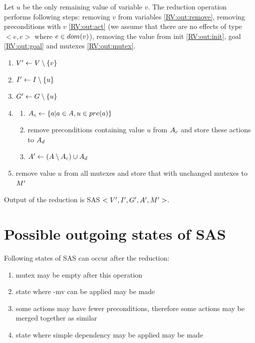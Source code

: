 	Let $u$ be the only remaining value of variable $v$. The reduction operation performs following steps: removing $v$ from variables \ref{RV:out:remove}, removing preconditions with $v$ \ref{RV:out:act} (we assume that there are no effects of type $<e,e>$ where $e \in dom(v)$), removing the value from init \ref{RV:out:init}, goal \ref{RV:out:goal} and mutexes \ref{RV:out:mutex}.
	
	\begin{enumerate}
		\item $V{}' \leftarrow V \setminus \{v\}$ \label{RV:out:remove}
		\item $I{}' \leftarrow I \setminus \{u\}$ \label{RV:out:init}
		\item $G{}' \leftarrow G \setminus \{u\}$ \label{RV:out:goal}
		\item \begin{enumerate}
			\item $A{}_c \leftarrow \{a | a \in A, u \in pre(a)\}$
			\item remove preconditions containing value $u$ from $A{}_c$ and store these actions to $A{}_d$
			\item $A{}' \leftarrow (A \setminus A{}_c) \cup A{}_d$ \label{RV:out:act}
		\end{enumerate}
		\item remove value $u$ from all mutexes and store that with unchanged mutexes to $M{}'$ \label{RV:out:mutex}
	\end{enumerate}
	
	Output of the reduction is SAS $<V{}', I{}', G{}', A{}', M{}'>$.
	
	\section{Possible outgoing states of SAS}
	Following states of SAS can occur after the reduction:
	
	\begin{enumerate}
		\item mutex may be empty after this operation 
		\item state where -mv can be applied may be made
		\item some actions may have fewer preconditions, therefore some actions may be merged together as similar
		\item state where simple dependency may be applied may be made
	\end{enumerate}
	
